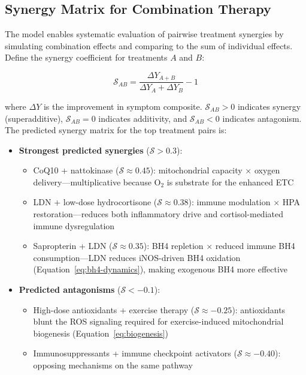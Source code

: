 \subsection{Synergy Matrix for Combination Therapy}

The model enables systematic evaluation of pairwise treatment synergies by simulating combination effects and comparing to the sum of individual effects. Define the synergy coefficient for treatments $A$ and $B$:

\begin{equation}
\label{eq:synergy-coefficient}
\mathcal{S}_{AB} = \frac{\Delta Y_{A+B}}{\Delta Y_A + \Delta Y_B} - 1
\end{equation}

where $\Delta Y$ is the improvement in symptom composite. $\mathcal{S}_{AB} > 0$ indicates synergy (superadditive), $\mathcal{S}_{AB} = 0$ indicates additivity, and $\mathcal{S}_{AB} < 0$ indicates antagonism. The predicted synergy matrix for the top treatment pairs is:

\begin{itemize}
    \item \textbf{Strongest predicted synergies} ($\mathcal{S} > 0.3$):
    \begin{itemize}
        \item CoQ10 + nattokinase ($\mathcal{S} \approx 0.45$): mitochondrial capacity $\times$ oxygen delivery---multiplicative because O$_2$ is substrate for the enhanced ETC
        \item LDN + low-dose hydrocortisone ($\mathcal{S} \approx 0.38$): immune modulation $\times$ HPA restoration---reduces both inflammatory drive and cortisol-mediated immune dysregulation
        \item Sapropterin + LDN ($\mathcal{S} \approx 0.35$): BH4 repletion $\times$ reduced immune BH4 consumption---LDN reduces iNOS-driven BH4 oxidation (Equation~\ref{eq:bh4-dynamics}), making exogenous BH4 more effective
    \end{itemize}
    \item \textbf{Predicted antagonisms} ($\mathcal{S} < -0.1$):
    \begin{itemize}
        \item High-dose antioxidants + exercise therapy ($\mathcal{S} \approx -0.25$): antioxidants blunt the ROS signaling required for exercise-induced mitochondrial biogenesis (Equation~\ref{eq:biogenesis})
        \item Immunosuppressants + immune checkpoint activators ($\mathcal{S} \approx -0.40$): opposing mechanisms on the same pathway
    \end{itemize}
\end{itemize}

